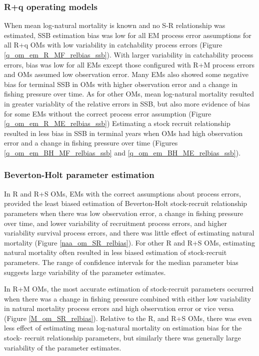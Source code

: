 \documentclass[
  12pt,
]{article}
\begin{document}
\hypertarget{rq-operating-models-1}{%
\subsubsection*{R+q operating models}\label{rq-operating-models-1}}

When mean log-natural mortality is known and no S-R relationship was
estimated, SSB estimation bias was low for all EM process error
assumptions for all R+q OMs with low variability in catchability process
errors (Figure \ref{q_om_em_R_MF_relbias_ssb}). With larger variability
in catchability process errors, bias was low for all EMs except those
configured with R+M process errors and OMs assumed low observation
error. Many EMs also showed some negative bias for terminal SSB in OMs
with higher observation error and a change in fishing pressure over
time. As for other OMs, mean log-natural mortality resulted in greater
variablity of the relative errors in SSB, but also more evidence of bias
for some EMs without the correct process error assumption (Figure
\ref{q_om_em_R_ME_relbias_ssb}) Estimating a stock recruit relationship
resulted in less bias in SSB in terminal years when OMs had high
observation error and a change in fishing pressure over time (Figures
\ref{q_om_em_BH_MF_relbias_ssb} and \ref{q_om_em_BH_ME_relbias_ssb}).

\hypertarget{beverton-holt-parameter-estimation}{%
\subsubsection*{Beverton-Holt parameter
estimation}\label{beverton-holt-parameter-estimation}}

In R and R+S OMs, EMs with the correct assumptions about process errors,
provided the least biased estimation of Beverton-Holt stock-recruit
relationship parameters when there was low observation error, a change
in fishing pressure over time, and lower variability of recruitment
process errors, and higher variability survival process errors, and
there was little effect of estimating natural mortality (Figure
\ref{naa_om_SR_relbias}). For other R and R+S OMs, estimating natural
mortality often resulted in less biased estimation of stock-recruit
parameters. The range of confidence intervals for the median parameter
bias suggests large variability of the parameter estimates.

In R+M OMs, the most accurate estimation of stock-recruit parameters
occurred when there was a change in fishing pressure combined with
either low variability in natural mortality process errors and high
observation error or vice versa (Figure \ref{M_om_SR_relbias}). Relative
to the R, and R+S OMs, there was even less effect of estimating mean
log-natural mortality on estimation bias for the stock- recruit
relationship parameters, but similarly there was generally large
variability of the parameter estimates.
\end{document}
